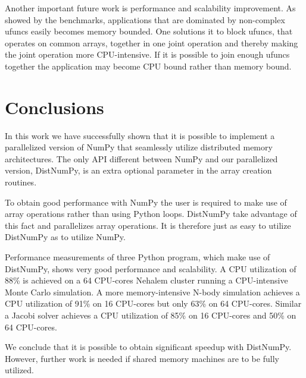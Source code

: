 \documentclass[10pt]{article}
\begin{document}
Another important future work is performance and scalability improvement. As showed by the benchmarks, applications that are dominated by non-complex ufuncs easily becomes memory bounded. One solutions it to block ufuncs, that operates on common arrays, together in one joint operation and thereby making the joint operation more CPU-intensive. If it is possible to join enough ufuncs together the application may become CPU bound rather than memory bound.



\section{Conclusions}
In this work we have successfully shown that it is possible to implement a parallelized version of NumPy\cite{numpy} that seamlessly utilize distributed memory architectures. The only API different between NumPy and our parallelized version, DistNumPy, is an extra optional parameter in the array creation routines.

To obtain good performance with NumPy the user is required to make use of array operations rather than using Python loops. DistNumPy take advantage of this fact and parallelizes array operations. It is therefore just as easy to utilize DistNumPy as to utilize NumPy.

Performance measurements of three Python program, which make use of DistNumPy, shows very good performance and scalability. A CPU utilization of 88\% is achieved on a 64 CPU-cores Nehalem cluster running a CPU-intensive Monte Carlo simulation. A more memory-intensive N-body simulation achieves a CPU utilization of 91\% on 16 CPU-cores but only 63\% on 64 CPU-cores. Similar a Jacobi solver achieves a CPU utilization of 85\% on 16 CPU-cores and 50\% on 64 CPU-cores.

We conclude that it is possible to obtain significant speedup with DistNumPy. However, further work is needed if shared memory machines are to be fully utilized. 





%


\end{document}
